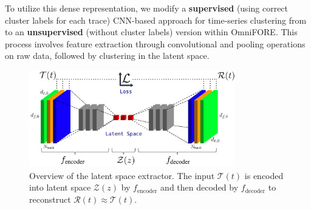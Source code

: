 \documentclass{ieeetmlcn}
\begin{document}
To utilize this dense representation, we modify a \textbf{supervised} (using correct cluster labels for each trace) CNN-based approach for time-series clustering from \cite{clusteringDL} to an \textbf{unsupervised} (without cluster labels) version within OmniFORE. This process involves feature extraction through convolutional and pooling operations on raw data, followed by clustering in the latent space.


\begin{figure}\centering
\centering
\centering\includegraphics[width=0.8\textwidth]{img/latent_space_creation.png}
\caption{Overview of the latent space extractor. The input $\mathcal{T}(t)$ is encoded into latent space $\mathcal{Z}(z)$ by $f_{\text{encoder}}$ and then decoded by $f_{\text{decoder}}$ to reconstruct $\mathcal{R}(t) \approx \mathcal{T}(t)$.}
\label{fig:latent_space_creation}
\end{figure}
\end{document}
